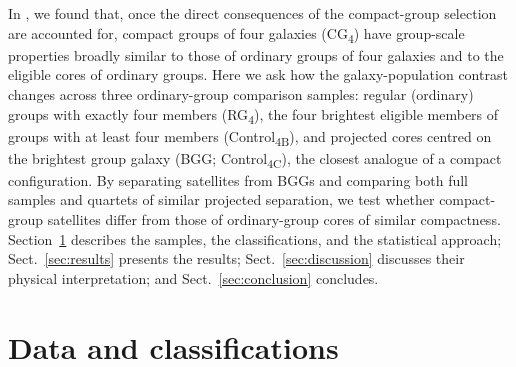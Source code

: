 \documentclass{aa}
\newcommand{\CB}{Control\textsubscript{4B}}
\newcommand{\CC}{Control\textsubscript{4C}}
\newcommand{\CG}{CG\textsubscript{4}}
\newcommand{\RG}{RG\textsubscript{4}}
\begin{document}
In \citet[hereafter Paper~I]{Tricottet+25}, we found that, once the direct consequences of the compact-group selection are accounted for, compact groups of four galaxies (\CG) have group-scale properties broadly similar to those of ordinary groups of four galaxies and to the eligible cores of ordinary groups. Here we ask how the galaxy-population contrast changes across three ordinary-group comparison samples: regular (ordinary) groups with exactly four members (\RG{}), the four brightest eligible members of groups with at least four members (\CB{}), and projected cores centred on the brightest group galaxy (BGG; \CC{}), the closest analogue of a compact configuration. By separating satellites from BGGs and comparing both full samples and quartets of similar projected separation, we test whether compact-group satellites differ from those of ordinary-group cores of similar compactness. Section~\ref{sec:data} describes the samples, the classifications, and the statistical approach; Sect.~\ref{sec:results} presents the results; Sect.~\ref{sec:discussion} discusses their physical interpretation; and Sect.~\ref{sec:conclusion} concludes.

\section{Data and classifications}\label{sec:data}
\end{document}
